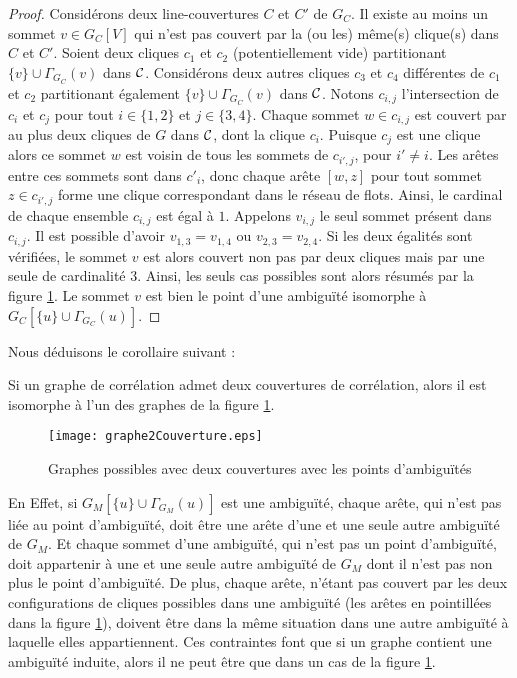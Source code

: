 \begin{proof} 
	Consid\'erons deux line-couvertures $C$ et $C'$ de $G_C$. 
	Il existe au moins un sommet $v \in G_C[V]$ qui n'est pas couvert par la (ou les) m\^eme(s) clique(s) dans $C$ et $C'$.
	Soient deux cliques $c_1$ et $c_2$ (potentiellement vide) partitionant $\{v\} \cup \Gamma_{G_C}(v)$ dans $\cal C$.
	Consid\'erons deux autres cliques $c_3$ et $c_4$ diff\'erentes de $c_1$ et $c_2$ partitionant \'egalement $\{v\} \cup \Gamma_{G_C}(v)$ dans $\cal C$. \newline
	Notons $c_{i,j}$ l'intersection de $c_{i}$ et $c_j$ pour tout $i \in \{1,2\}$ et $j \in \{3,4\}$. 
	Chaque sommet $w \in c_{i,j}$ est couvert par au plus deux cliques de $G$ dans $\cal C$, dont la clique $c_i$.
	Puisque $c_j$ est une clique alors ce sommet $w$ est voisin de tous les sommets de  $c_{i',j}$, pour $i' \ne i$.
	Les ar\^etes entre ces sommets sont dans $c'_i$, donc chaque ar\^ete $[w,z]$ pour tout sommet  $z \in c_{i',j}$ forme une clique correspondant dans le r\'eseau de flots.
	Ainsi, le cardinal de chaque ensemble  $c_{i,j}$ est \'egal \`a $1$.\newline
	Appelons $v_{i,j}$ le seul sommet pr\'esent dans $c_{i,j}$. 
	Il est possible d'avoir $v_{1,3} = v_{1,4}$ ou $v_{2,3} = v_{2,4}$.
	Si les deux \'egalit\'es sont v\'erifi\'ees, le sommet $v$ est alors couvert non pas par deux cliques mais par une seule de cardinalit\'e $3$.
	Ainsi, les seuls cas possibles sont alors r\'esum\'es par la figure  \ref{graphe2Couverture}.
	Le sommet $v$ est bien le point d'une ambigu\"{i}t\'e isomorphe \`a $G_C[\{u\} \cup \Gamma_{G_C}(u)]$.
\end{proof}

Nous d\'eduisons le corollaire suivant :
\begin{corollary}
Si un graphe de corr\'elation admet deux couvertures de corr\'elation, alors il est isomorphe \`a l'un des graphes de la figure  \ref{graphe2Couverture}.
\end{corollary}

\begin{figure}[htb!] \vspace{-0.5em}
\centering
\texttt{[image: graphe2Couverture.eps]}
\caption{ Graphes possibles avec deux couvertures avec les points d'ambigu\"{i}t\'es }
\label{graphe2Couverture} 
\end{figure}
En Effet, si $G_M[\{u\} \cup \Gamma_{G_M}(u)]$ est une ambigu\"{i}t\'e, chaque ar\^ete, qui n'est pas li\'ee au point d'ambigu\"{i}t\'e, doit \^etre une ar\^ete d'une et une seule autre ambigu\"{i}t\'e de $G_M$. Et chaque sommet d'une ambigu\"{i}t\'e, qui n'est pas un point d'ambigu\"{i}t\'e, doit appartenir \`a une et une seule autre ambigu\"{i}t\'e de $G_M$ dont il n'est pas non  plus le point d'ambigu\"{i}t\'e.
De plus, chaque ar\^ete, n'\'etant pas couvert par les deux configurations de cliques possibles dans une ambigu\"{i}t\'e (les ar\^etes en pointill\'ees dans la figure \ref{graphe2Couverture}), doivent \^etre dans la m\^eme situation dans une autre ambigu\"{i}t\'e \`a laquelle elles appartiennent.
Ces contraintes font que si un graphe contient une ambigu\"{i}t\'e induite, alors il ne peut \^etre que dans un cas de la figure  \ref{graphe2Couverture}.


